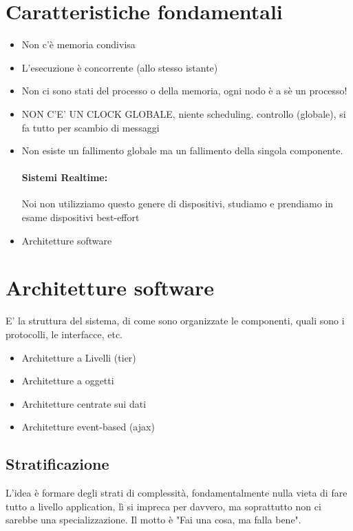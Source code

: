 \documentclass[12pt, a4paper, openany, twoside]{book}
\begin{document}
\section{Caratteristiche fondamentali}
\begin{itemize}
	\item Non c'è memoria condivisa
	\item L'esecuzione è concorrente (allo stesso istante)
	\item Non ci sono stati del processo o della memoria, ogni nodo è a sè un
	processo!
	\item NON C'E' UN CLOCK GLOBALE, niente scheduling. controllo (globale),
	si fa tutto per scambio di messaggi
	\item Non esiste un fallimento globale ma un fallimento della singola
	componente. 
	\paragraph{Sistemi Realtime:} Noi non utilizziamo questo genere di 
	dispositivi, studiamo e prendiamo in esame dispositivi best-effort
	\item Architetture software
\end{itemize}
\section{Architetture software}
E' la struttura del sistema, di come sono organizzate le componenti, quali
sono i protocolli, le interfacce, etc.
\begin{itemize}
	\item Architetture a Livelli (tier)
	\item Architetture a oggetti
	\item Architetture centrate sui dati
	\item Architetture event-based (ajax)
\end{itemize}
\subsection{Stratificazione}
L'idea è formare degli strati di complessità, fondamentalmente nulla vieta di 
fare tutto a livello application, lì si impreca per davvero, ma soprattutto
non ci sarebbe una specializzazione. Il motto è "Fai una cosa, ma falla bene".
\end{document}
